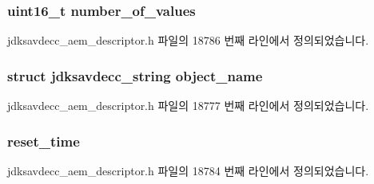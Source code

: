 \subsubsection[{\texorpdfstring{number\+\_\+of\+\_\+values}{number_of_values}}]{\setlength{\rightskip}{0pt plus 5cm}uint16\+\_\+t number\+\_\+of\+\_\+values}\hypertarget{structjdksavdecc__descriptor__control_a1c32421ead62b8a032c4346688cd9b69}{}\label{structjdksavdecc__descriptor__control_a1c32421ead62b8a032c4346688cd9b69}


jdksavdecc\+\_\+aem\+\_\+descriptor.\+h 파일의 18786 번째 라인에서 정의되었습니다.

\subsubsection[{\texorpdfstring{object\+\_\+name}{object_name}}]{\setlength{\rightskip}{0pt plus 5cm}struct {\bf jdksavdecc\+\_\+string} object\+\_\+name}\hypertarget{structjdksavdecc__descriptor__control_a7d1f5945a13863b1762fc6db74fa8f80}{}\label{structjdksavdecc__descriptor__control_a7d1f5945a13863b1762fc6db74fa8f80}


jdksavdecc\+\_\+aem\+\_\+descriptor.\+h 파일의 18777 번째 라인에서 정의되었습니다.

\subsubsection[{\texorpdfstring{reset\+\_\+time}{reset_time}}]{ reset\+\_\+time}\hypertarget{structjdksavdecc__descriptor__control_a8fb66f63094794fbbdacc69af5cc55fa}{}\label{structjdksavdecc__descriptor__control_a8fb66f63094794fbbdacc69af5cc55fa}


jdksavdecc\+\_\+aem\+\_\+descriptor.\+h 파일의 18784 번째 라인에서 정의되었습니다.

